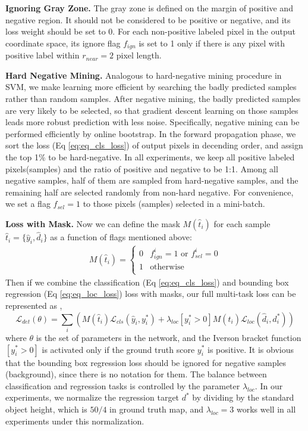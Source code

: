 \textbf{Ignoring Gray Zone.} 
The gray zone is defined on the margin of positive and negative region. It should not be considered to be positive or negative, and its loss weight should be set to $0$.  For each non-positive labeled pixel in the output coordinate space, its ignore flag $f_{ign}$ is set to 1 only if there is any pixel with positive label within $r_{near} = 2$ pixel length.  

\textbf{Hard Negative Mining.} 
Analogous to hard-negative mining procedure in SVM, we make learning more efficient by searching the badly predicted samples rather than random samples. After negative mining, the badly predicted samples are very likely to be selected, so that gradient descent learning on those samples leads more robust prediction with less noise. Specifically, negative mining can be performed efficiently by online bootstrap. In the forward propagation phase, we sort the loss (Eq \ref{eq:eq_cls_loss}) of output pixels in decending order, and assign the top 1\% to be hard-negative.   In all experiments, we keep all positive labeled pixels(samples) and the ratio of positive and negative to be 1:1.  Among all negative samples, half of them are sampled from hard-negative samples, and the remaining half are selected randomly from non-hard negative. For convenience, we set a flag $f_{sel} = 1$ to those pixels (samples) selected in a mini-batch. 

\textbf{Loss with Mask.} 
Now we can define the mask $M(\hat{t}_i)$ for each sample $\hat{t}_i = \{ \hat{y}_i, \hat{d}_i \}$ as a function of flags mentioned above:
	\begin{eqnarray}\label{eq:eq_mask}
	M(\hat{t}_i) =
	\begin{cases}
	0 &  f_{ign}^{i} = 1 \text{ or } f_{sel}^{i} = 0 \\
	1 & \text{otherwise} \\
	\end{cases}
	\end{eqnarray}
 Then if we combine the classification (Eq \ref{eq:eq_cls_loss})  and bounding box regression (Eq \ref{eq:eq_loc_loss}) loss with masks, our full multi-task loss can be represented as ,
	\begin{equation}\label{eq:eq_det_loss}
	\mathcal{L} _{det}(\theta) =  \sum_{i}  \left ( M(\hat{t}_i) \mathcal{L} _{cls}(\hat{y}_i,y^*_i) + \lambda_{loc} [y^*_i >0]M(\hat{t}_i) \mathcal{L} _{loc}(\hat{d}_i,d^*_i) \right )
	\end{equation}
where $\theta$ is the set of parameters in the network, and the Iverson bracket function $[y^*_i >0]$ is activated only if the ground truth score $y^*_i$ is positive. It is obvious that the bounding box regression loss should be ignored for negative samples (background), since there is no notation for them. The balance between classification and regression tasks is controlled by the parameter $\lambda_{loc}$. In our experiments, we normalize the regression target $d^*$ by dividing by the standard object height, which is $50/4$ in ground truth map, and $\lambda_{loc} = 3$ works well in all experiments under this normalization. 

